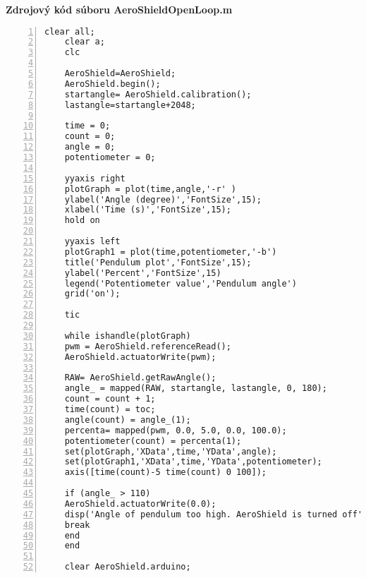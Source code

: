 \LARGE\bf{Zdrojový kód súboru AeroShieldOpenLoop.m}
\label{AeroShieldOpenLoop.m}
\vspace{1cm}
\begin{lstlisting}[numbers=left,basicstyle=\scriptsize,caption={Zdrojový kód súboru AeroShieldOpenLoop.m.},captionpos=b]	
	clear all;
	clear a;
	clc 
	
	AeroShield=AeroShield;
	AeroShield.begin();
	startangle= AeroShield.calibration(); 
	lastangle=startangle+2048;
	
	time = 0;
	count = 0;
	angle = 0;
	potentiometer = 0;
	
	yyaxis right  
	plotGraph = plot(time,angle,'-r' )
	ylabel('Angle (degree)','FontSize',15);
	xlabel('Time (s)','FontSize',15); 
	hold on  
	
	yyaxis left 
	plotGraph1 = plot(time,potentiometer,'-b')
	title('Pendulum plot','FontSize',15);
	ylabel('Percent','FontSize',15)  
	legend('Potentiometer value','Pendulum angle')
	grid('on');
	
	tic    
	
	while ishandle(plotGraph)  
	pwm = AeroShield.referenceRead();
	AeroShield.actuatorWrite(pwm);
	
	RAW= AeroShield.getRawAngle();  
	angle_ = mapped(RAW, startangle, lastangle, 0, 180);
	count = count + 1;  
	time(count) = toc;      
	angle(count) = angle_(1);   
	percenta= mapped(pwm, 0.0, 5.0, 0.0, 100.0); 
	potentiometer(count) = percenta(1);          
	set(plotGraph,'XData',time,'YData',angle);   
	set(plotGraph1,'XData',time,'YData',potentiometer);
	axis([time(count)-5 time(count) 0 100]);  
	
	if (angle_ > 110)                         
	AeroShield.actuatorWrite(0.0);    
	disp('Angle of pendulum too high. AeroShield is turned off')
	break                              
	end
	end             
	
	clear AeroShield.arduino;
\end{lstlisting}